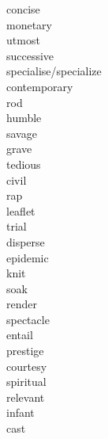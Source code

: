 \documentclass[b5paper, 11pt]{ctexart}
\begin{document}
\begin{multicols*}{3}
\begin{description}
\item[concise]

\item[monetary]

\item[utmost]

\item[successive]

\item[specialise/specialize]

\item[contemporary]

\item[rod]

\item[humble]

\item[savage]

\item[grave]

\item[tedious]

\item[civil]

\item[rap]

\item[leaflet]

\item[trial]

\item[disperse]

\item[epidemic]

\item[knit]

\item[soak]

\item[render]

\item[spectacle]

\item[entail]

\item[prestige]

\item[courtesy]

\item[spiritual]

\item[relevant]

\item[infant]

\item[cast]


\end{description}
\end{multicols*}
\end{document}

